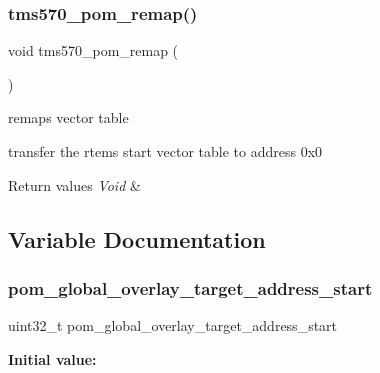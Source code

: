 \subsubsection{\texorpdfstring{tms570\_pom\_remap()}{tms570\_pom\_remap()}}
{\footnotesize\ttfamily void tms570\+\_\+pom\+\_\+remap (\begin{DoxyParamCaption}\item[{void}]{ }\end{DoxyParamCaption})}



remaps vector table 

transfer the rtems start vector table to address 0x0


\begin{DoxyRetVals}{Return values}
{\em Void} & \\
\hline
\end{DoxyRetVals}


\subsection{Variable Documentation}
\mbox{\label{tms570-pom_8c_ae0d922fd7d45846492b1831f79536c7c}} 
\subsubsection{\texorpdfstring{pom\_global\_overlay\_target\_address\_start}{pom\_global\_overlay\_target\_address\_start}}
{\footnotesize\ttfamily uint32\+\_\+t pom\+\_\+global\+\_\+overlay\+\_\+target\+\_\+address\+\_\+start}

{\bfseries Initial value\+:}
\begin{DoxyCode}{0}
\DoxyCodeLine{=}

\end{DoxyCode}
